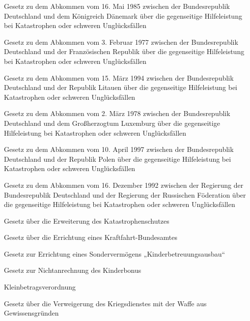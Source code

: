 \item[{KatHiLAbkDNKG}] Gesetz zu dem Abkommen vom 16. Mai 1985 zwischen der Bundesrepublik Deutschland und dem Königreich Dänemark über die gegenseitige Hilfeleistung bei Katastrophen oder schweren Unglücksfällen

\item[{KatHiLAbkFRAG}] Gesetz zu dem Abkommen vom 3. Februar 1977 zwischen der Bundesrepublik Deutschland und der Französischen Republik über die gegenseitige Hilfeleistung bei Katastrophen oder schweren Unglücksfällen

\item[{KatHiLAbkLITG}] Gesetz zu dem Abkommen vom 15. März 1994 zwischen der Bundesrepublik Deutschland und der Republik Litauen über die gegenseitige Hilfeleistung bei Katastrophen oder schweren Unglücksfällen

\item[{KatHiLAbkLUXG}] Gesetz zu dem Abkommen vom 2. März 1978 zwischen der Bundesrepublik Deutschland und dem Großherzogtum Luxemburg über die gegenseitige Hilfeleistung bei Katastrophen oder schweren Unglücksfällen

\item[{KatHiLAbkPOLG}] Gesetz zu dem Abkommen vom 10. April 1997 zwischen der Bundesrepublik Deutschland und der Republik Polen über die gegenseitige Hilfeleistung bei Katastrophen oder schweren Unglücksfällen

\item[{KatHiLAbkRussFöG}] Gesetz zu dem Abkommen vom 16. Dezember 1992 zwischen der Regierung der Bundesrepublik Deutschland und der Regierung der Russischen Föderation über die gegenseitige Hilfeleistung bei Katastrophen oder schweren Unglücksfällen

\item[{KatSchErwG}] Gesetz über die Erweiterung des Katastrophenschutzes

\item[{KBAG}] Gesetz über die Errichtung eines Kraftfahrt-Bundesamtes

\item[{KBFG}] Gesetz zur Errichtung eines Sondervermögens „Kinderbetreuungsausbau“

\item[{KBNAnrG}] Gesetz zur Nichtanrechnung des Kinderbonus

\item[{KBV-2002}] Kleinbetragsverordnung

\item[{KDVG}] Gesetz über die Verweigerung des Kriegsdienstes mit der Waffe aus Gewissensgründen

